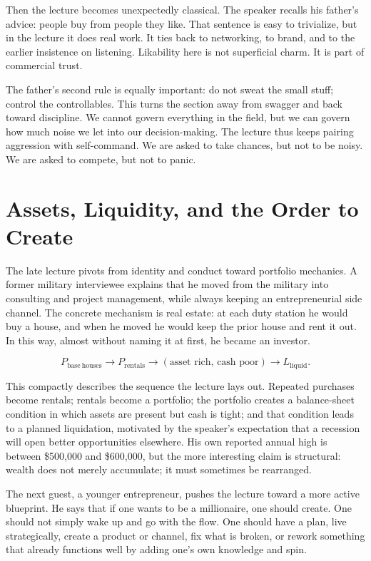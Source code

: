 Then the lecture becomes unexpectedly classical. The speaker recalls his father's advice: people buy from people they like. That sentence is easy to trivialize, but in the lecture it does real work. It ties back to networking, to brand, and to the earlier insistence on listening. Likability here is not superficial charm. It is part of commercial trust.

The father's second rule is equally important: do not sweat the small stuff; control the controllables. This turns the section away from swagger and back toward discipline. We cannot govern everything in the field, but we can govern how much noise we let into our decision-making. The lecture thus keeps pairing aggression with self-command. We are asked to take chances, but not to be noisy. We are asked to compete, but not to panic.

\section{Assets, Liquidity, and the Order to Create}

The late lecture pivots from identity and conduct toward portfolio mechanics. A former military interviewee explains that he moved from the military into consulting and project management, while always keeping an entrepreneurial side channel. The concrete mechanism is real estate: at each duty station he would buy a house, and when he moved he would keep the prior house and rent it out. In this way, almost without naming it at first, he became an investor.

\begin{equation}
P_{\mathrm{base\ houses}} \to P_{\mathrm{rentals}} \to (\text{asset rich},\,\text{cash poor}) \to L_{\mathrm{liquid}}.
\end{equation}

This compactly describes the sequence the lecture lays out. Repeated purchases become rentals; rentals become a portfolio; the portfolio creates a balance-sheet condition in which assets are present but cash is tight; and that condition leads to a planned liquidation, motivated by the speaker's expectation that a recession will open better opportunities elsewhere. His own reported annual high is between \$500{,}000 and \$600{,}000, but the more interesting claim is structural: wealth does not merely accumulate; it must sometimes be rearranged.

The next guest, a younger entrepreneur, pushes the lecture toward a more active blueprint. He says that if one wants to be a millionaire, one should create. One should not simply wake up and go with the flow. One should have a plan, live strategically, create a product or channel, fix what is broken, or rework something that already functions well by adding one's own knowledge and spin.

